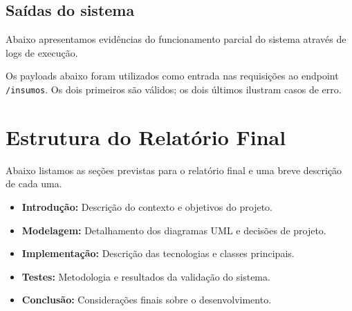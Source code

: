 

\subsection{Saídas do sistema}
Abaixo apresentamos evidências do funcionamento parcial do sistema através de logs de execução.

Os payloads abaixo foram utilizados como entrada nas requisições ao endpoint \texttt{/insumos}.
Os dois primeiros são válidos; os dois últimos ilustram casos de erro.













\section{Estrutura do Relatório Final}
Abaixo listamos as seções previstas para o relatório final e uma
breve descrição de cada uma.

\begin{itemize}
  \item \textbf{Introdução:} Descrição do contexto e objetivos do projeto.
  \item \textbf{Modelagem:} Detalhamento dos diagramas UML e decisões
    de projeto.
  \item \textbf{Implementação:} Descrição das tecnologias e classes principais.
  \item \textbf{Testes:} Metodologia e resultados da validação do sistema.
  \item \textbf{Conclusão:} Considerações finais sobre o desenvolvimento.
\end{itemize}

